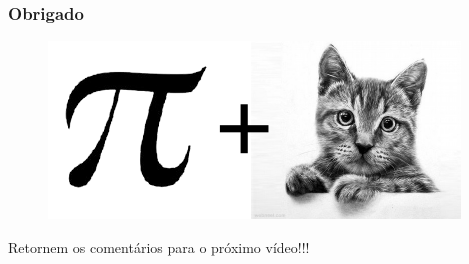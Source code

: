 \documentclass[10pt]{beamer}
\begin{document}

\begin{frame}
    \frametitle{Obrigado}

\begin{figure}[!ht]
\centering
\includegraphics[height=0.45\textheight]{figures/meu_logo_picat.pdf}
\end{figure}
 Retornem os comentários para o próximo vídeo!!!


\end{frame}
\end{document}

